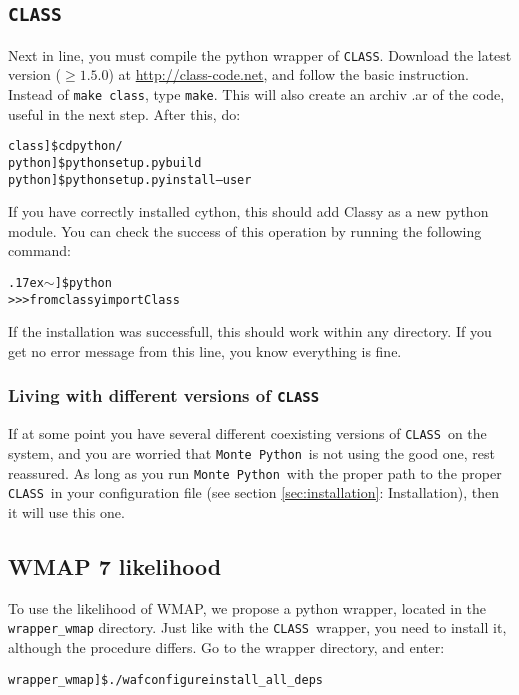 \documentclass[10pt]{article}
\newcommand{\CLASS}{\texttt{CLASS}}
\newcommand{\MP}{\texttt{Monte Python}}
\newcommand{\tild}{\raise.17ex\hbox{$\scriptstyle\mathtt{\sim}$}}
\begin{document}
  \subsection{\CLASS}

  Next in line, you must compile the python wrapper of \CLASS. Download the
  latest version ($\geq 1.5.0$) at \url{http://class-code.net}, and follow the basic
  instruction. Instead of  \verb?make class?, type \verb?make?. This will
  also create an archiv .ar of the code, useful in the next step. After this, do:

  \begin{alltt}
   class]\$ cd python/
   python]\$ python setup.py build
   python]\$ python setup.py install --user
  \end{alltt}

  If you have correctly installed cython, this should add Classy as a new python
  module. You can check the success of this operation by running the following
  command:

  \begin{alltt}
    \tild]\$ python
    >>> from classy import Class
  \end{alltt}

If the installation was successfull, this should work within any directory. If you get no error message from this line, you know everything is fine.

  \subsubsection*{Living with different versions of \CLASS}

  If at some point you have several different coexisting versions of \CLASS~on the system, and you are worried that \MP~is not using the good one, rest
  reassured. As long as you run \MP~with the proper path to the proper \CLASS~in your configuration file (see section \ref{sec:installation}: Installation),
  then it will use this one.

  \subsection{WMAP 7 likelihood}

  To use the likelihood of WMAP, we propose a python wrapper, located in the
  \verb?wrapper_wmap? directory. Just like with the \CLASS~wrapper, you need to
  install it, although the procedure differs. Go to the wrapper directory, and enter:

  \begin{alltt}
    wrapper_wmap]\$ ./waf configure install_all_deps
  \end{alltt}
\end{document}
